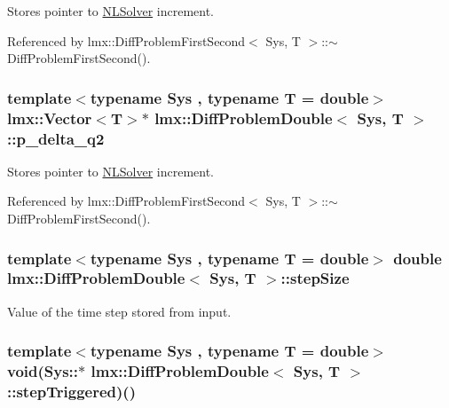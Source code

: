 Stores pointer to \hyperlink{classlmx_1_1NLSolver}{N\-L\-Solver} increment. 



Referenced by lmx\-::\-Diff\-Problem\-First\-Second$<$ Sys, T $>$\-::$\sim$\-Diff\-Problem\-First\-Second().

\hypertarget{classlmx_1_1DiffProblemDouble_a0f6147b1376247d0fc18327da7946401}{
\subsubsection[{p\-\_\-delta\-\_\-q2}]{\setlength{\rightskip}{0pt plus 5cm}template$<$typename Sys , typename T  = double$>$ {\bf lmx\-::\-Vector}$<$T$>$$\ast$ {\bf lmx\-::\-Diff\-Problem\-Double}$<$ Sys, T $>$\-::p\-\_\-delta\-\_\-q2\hspace{0.3cm}{\ttfamily [protected]}}}\label{classlmx_1_1DiffProblemDouble_a0f6147b1376247d0fc18327da7946401}


Stores pointer to \hyperlink{classlmx_1_1NLSolver}{N\-L\-Solver} increment. 



Referenced by lmx\-::\-Diff\-Problem\-First\-Second$<$ Sys, T $>$\-::$\sim$\-Diff\-Problem\-First\-Second().

\hypertarget{classlmx_1_1DiffProblemDouble_a65a47b229f04c1de32d33af03dd8b448}{
\subsubsection[{step\-Size}]{\setlength{\rightskip}{0pt plus 5cm}template$<$typename Sys , typename T  = double$>$ double {\bf lmx\-::\-Diff\-Problem\-Double}$<$ Sys, T $>$\-::step\-Size\hspace{0.3cm}{\ttfamily [protected]}}}\label{classlmx_1_1DiffProblemDouble_a65a47b229f04c1de32d33af03dd8b448}


Value of the time step stored from input. 

\hypertarget{classlmx_1_1DiffProblemDouble_a86019217395c38514e7765294dc55ac8}{
\subsubsection[{step\-Triggered}]{\setlength{\rightskip}{0pt plus 5cm}template$<$typename Sys , typename T  = double$>$ void(Sys\-::$\ast$  {\bf lmx\-::\-Diff\-Problem\-Double}$<$ Sys, T $>$\-::step\-Triggered)()\hspace{0.3cm}{\ttfamily [protected]}}}\label{classlmx_1_1DiffProblemDouble_a86019217395c38514e7765294dc55ac8}


